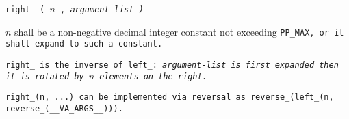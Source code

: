 
\tt{right_ (} $n$ \tt{,} \it{argument-list} \tt{)}


$n$ shall be a non-negative decimal integer constant not exceeding \tt{PP_MAX},
or it shall expand to such a constant.


\tt{right_} is the inverse of \tt{left_}: \it{argument-list}
is first expanded then it is rotated by $n$ elements on the right.

\note \tt{right_(n, ...)} can be implemented via reversal as
\tt{reverse_(left_(n, reverse_(__VA_ARGS__)))}.
